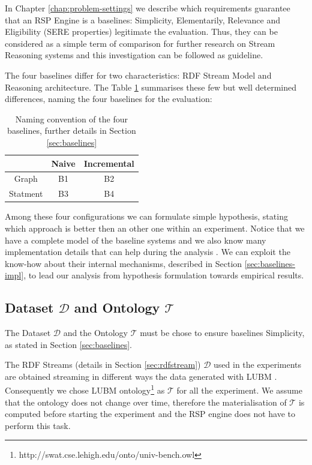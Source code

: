 In Chapter \ref{chap:problem-settings} we describe which requirements guarantee that an RSP Engine is a baselines: Simplicity, Elementarily, Relevance and Eligibility (SERE properties) legitimate the evaluation. Thus, they can be considered as a simple term of comparison for further research on Stream Reasoning systems and this investigation can be followed as guideline.
 
The four baselines differ for two characteristics: RDF Stream Model and Reasoning architecture. The Table \ref{tab:baselines-names} summarises these few but well determined differences, naming the four baselines for the evaluation:\begin{table}[htb]
\scriptsize
\centering
\begin{tabular}{c|cc} %
	\hline
         & Naive & Incremental\\
	\hline
	Graph        &  B1      & B2\\
	Statment   &  B3   & B4\\
	\hline %
\end{tabular}
\caption{Naming convention of the four baselines, further details in Section \ref{sec:baselines}}
\label{tab:baselines-names}
\end{table}

\noindent Among these four configurations we can formulate simple hypothesis, stating which approach is better then an other one within an experiment. Notice that we have a complete model of the baseline systems and we also know many implementation details that can help during the analysis . We can exploit the know-how about their internal mechanisms, described in Section \ref{sec:baselines-impl}, to lead our analysis from hypothesis formulation towards empirical results. 

\subsection{Dataset $\mathcal{D}$ and Ontology $\mathcal{T}$}\label{sec:dataset}

\noindent The Dataset  $\mathcal{D}$ and the Ontology $\mathcal{T}$ must be chose to ensure baselines Simplicity, as stated in Section \ref{sec:baselines}. 

The RDF Streams (details in Section \ref{sec:rdfstream}) $\mathcal{D}$ used in the experiments are obtained streaming in different ways the data generated with LUBM  \cite{Guo2005}. Consequently we chose LUBM ontology\footnote{http://swat.cse.lehigh.edu/onto/univ-bench.owl} as $\mathcal{T}$ for all the experiment. We assume that the ontology does not change over time, therefore the materialisation of $\mathcal{T}$ is computed before starting the experiment and the RSP engine does not have to perform this task. 

